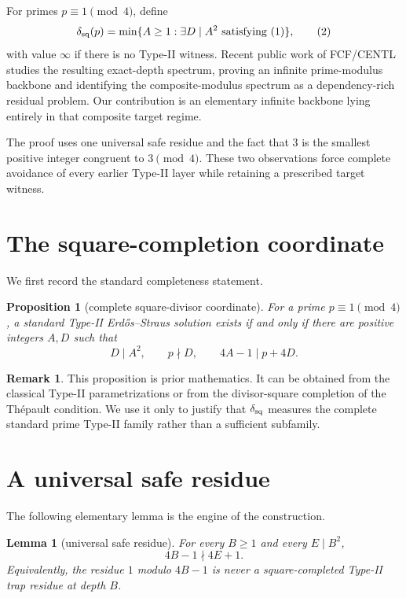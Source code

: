 \documentclass[11pt]{article}
\newtheorem{lemma}[theorem]{Lemma}
\newtheorem{proposition}[theorem]{Proposition}
\theoremstyle{definition}
\newtheorem{remark}[theorem]{Remark}
\begin{document}
For primes $p\equiv1\pmod4$, define
\[
\delta_{\rm sq}(p)
=\min\{A\ge1:\exists D\mid A^2\text{ satisfying (1)}\}, \tag{2}
\]
with value $\infty$ if there is no Type-II witness.  Recent public work of FCF/CENTL studies the resulting exact-depth spectrum, proving an infinite prime-modulus backbone and identifying the composite-modulus spectrum as a dependency-rich residual problem.  Our contribution is an elementary infinite backbone lying entirely in that composite target regime.

The proof uses one universal safe residue and the fact that $3$ is the smallest positive integer congruent to $3\pmod4$.  These two observations force complete avoidance of every earlier Type-II layer while retaining a prescribed target witness.

\section{The square-completion coordinate}
We first record the standard completeness statement.

\begin{proposition}[complete square-divisor coordinate]
For a prime $p\equiv1\pmod4$, a standard Type-II Erd\H{o}s--Straus solution exists if and only if there are positive integers $A,D$ such that
\[
D\mid A^2,\qquad p\nmid D,\qquad 4A-1\mid p+4D.
\]
\end{proposition}

\begin{remark}
This proposition is prior mathematics.  It can be obtained from the classical Type-II parametrizations or from the divisor-square completion of the Th\'epault condition.  We use it only to justify that $\delta_{\rm sq}$ measures the complete standard prime Type-II family rather than a sufficient subfamily.
\end{remark}

\section{A universal safe residue}
The following elementary lemma is the engine of the construction.

\begin{lemma}[universal safe residue]\label{lem:safe}
For every $B\ge1$ and every $E\mid B^2$,
\[
4B-1\nmid4E+1.
\]
Equivalently, the residue $1$ modulo $4B-1$ is never a square-completed Type-II trap residue at depth $B$.
\end{lemma}
\end{document}
